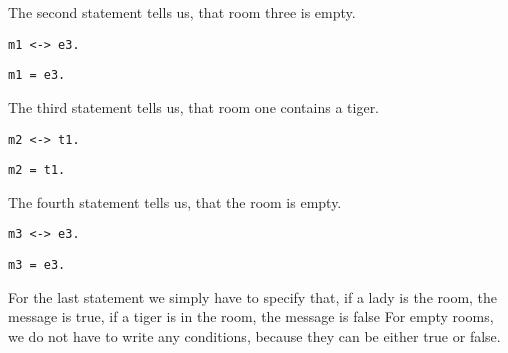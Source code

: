 The second statement tells us, that room three is empty.

\begin{multicols}{2}

\begin{lstlisting}[numbers=none,title=Propositional logic]
m1 <-> e3.
\end{lstlisting}

\begin{lstlisting}[numbers=none,title=Modular arithmetics]
m1 = e3.
\end{lstlisting}

\end{multicols}


The third statement tells us, that room one contains a tiger.

\begin{multicols}{2}

\begin{lstlisting}[numbers=none,title=Propositional logic]
m2 <-> t1.
\end{lstlisting}

\begin{lstlisting}[numbers=none,title=Modular arithmetics]
m2 = t1.
\end{lstlisting}

\end{multicols}

The fourth statement tells us, that the room is empty.

\begin{multicols}{2}

\begin{lstlisting}[numbers=none,title=Propositional logic]
m3 <-> e3.
\end{lstlisting}

\begin{lstlisting}[numbers=none,title=Modular arithmetics]
m3 = e3.
\end{lstlisting}

\end{multicols}



For the last statement we simply have to specify that, if a lady is the room, the  message is true, if a tiger is in the room, the message is false
For empty rooms, we do not have to write any conditions, because they can be either true or false.

